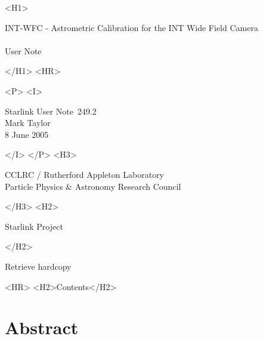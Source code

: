 \documentclass[twoside,11pt]{article}
\newcommand{\stardoccategory}  {Starlink User Note}
\newcommand{\stardocsource}    {sun\stardocnumber}
\newcommand{\stardocnumber}    {249.2}
\newcommand{\stardocauthors}   {Mark Taylor}
\newcommand{\stardocdate}      {8 June 2005}
\newcommand{\stardoctitle}     {INT-WFC - Astrometric Calibration for the INT Wide Field Camera}
\newcommand{\stardocversion}   {}
\newcommand{\stardocmanual}    {User Note}
\newcommand{\htmladdnormallink}[2]{#1}
\newcommand{\htmladdimg}[1]{}
\newcommand{\htmlref}[2]{#1}
\newcommand{\htmladdtonavigation}[1]{}
\newcommand{\xlabel}[1]{}
\renewcommand{\_}{\texttt{\symbol{95}}}
\begin{document}
\begin{htmlonly}
   \xlabel{}
   \begin{rawhtml} <H1> \end{rawhtml}
      \stardoctitle\\
      \stardocversion\\
      \stardocmanual
   \begin{rawhtml} </H1> <HR> \end{rawhtml}


   \begin{rawhtml} <P> <I> \end{rawhtml}
   \stardoccategory\ \stardocnumber \\
   \stardocauthors \\
   \stardocdate
   \begin{rawhtml} </I> </P> <H3> \end{rawhtml}
      \htmladdnormallink{CCLRC / Rutherford Appleton Laboratory}
                        {http://www.cclrc.ac.uk} \\
      \htmladdnormallink{Particle Physics \& Astronomy Research Council}
                        {http://www.pparc.ac.uk} \\
   \begin{rawhtml} </H3> <H2> \end{rawhtml}
      \htmladdnormallink{Starlink Project}{http://www.starlink.ac.uk/}
   \begin{rawhtml} </H2> \end{rawhtml}
   \htmladdnormallink{\htmladdimg{source.gif} Retrieve hardcopy}
      {http://www.starlink.ac.uk/cgi-bin/hcserver?\stardocsource}\\

  \label{stardoccontents}
  \begin{rawhtml}
    <HR>
    <H2>Contents</H2>
  \end{rawhtml}
  \htmladdtonavigation{\htmlref{\htmladdimg{contents_motif.gif}}
        {stardoccontents}}

  \section{\xlabel{abstract}Abstract}
\end{htmlonly}
\end{document}
